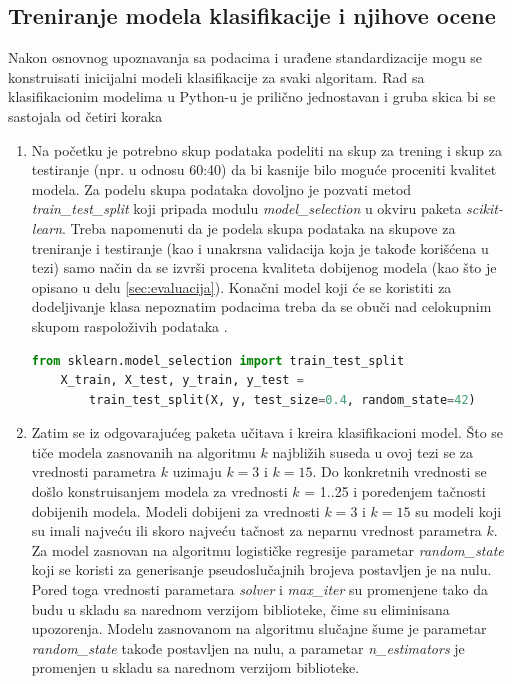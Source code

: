 \documentclass[12pt,oneside]{memoir}
\begin{document}
\subsection{Treniranje modela klasifikacije i njihove ocene}

Nakon osnovnog upoznavanja sa podacima i urađene standardizacije mogu se konstruisati inicijalni modeli klasifikacije za svaki algoritam. Rad sa klasifikacionim modelima u Python-u je prilično jednostavan i gruba skica bi se sastojala od četiri koraka \cite{scikit-learn}

\begin{enumerate}

\item Na početku je potrebno skup podataka podeliti na skup za trening i skup za testiranje (npr. u odnosu 60:40) da bi kasnije bilo moguće proceniti kvalitet modela. Za podelu skupa podataka dovoljno je pozvati metod \textit{train\_test\_split} koji pripada modulu \textit{model\_selection} u okviru paketa \textit{scikit-learn}. Treba napomenuti da je podela skupa podataka na skupove za treniranje i testiranje (kao i unakrsna validacija koja je takođe korišćena u tezi) samo način da se izvrši procena kvaliteta dobijenog modela (kao što je opisano u delu \ref{sec:evaluacija}). Konačni model koji će se koristiti za dodeljivanje klasa nepoznatim podacima treba da se obuči nad celokupnim skupom raspoloživih podataka \cite{mladen}.

\begin{lstlisting}[language=Python, basicstyle=\tiny]
	from sklearn.model_selection import train_test_split
	X_train, X_test, y_train, y_test = 
		train_test_split(X, y, test_size=0.4, random_state=42)
\end{lstlisting}

\item Zatim se iz odgovarajućeg paketa učitava i kreira klasifikacioni model. Što se tiče modela zasnovanih na algoritmu $k$ najbližih suseda u ovoj tezi se za vrednosti parametra $k$ uzimaju $k=3$ i $k=15$. Do konkretnih vrednosti se došlo konstruisanjem modela za vrednosti $k$ = 1..25 i poređenjem tačnosti dobijenih modela. Modeli dobijeni za vrednosti $k=3$ i $k=15$ su modeli koji su imali najveću ili skoro najveću tačnost za neparnu vrednost parametra $k$. Za model zasnovan na algoritmu logističke regresije parametar \textit{random\_state} koji se koristi za generisanje pseudoslučajnih brojeva postavljen je na nulu. Pored toga vrednosti parametara \textit{solver} i \textit{max\_iter} su promenjene tako da budu u skladu sa narednom verzijom biblioteke, čime su eliminisana upozorenja. Modelu zasnovanom na algoritmu slučajne šume je parametar \textit{random\_state} takođe postavljen na nulu, a parametar \textit{n\_estimators} je promenjen u skladu sa narednom verzijom biblioteke.
 

\end{enumerate}
\end{document}
